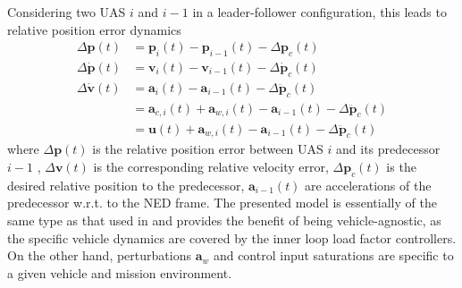 \documentclass{ifacconf}
\providecommand{\mbf}[1]{\mathbf{#1}}
\newcommand{\idxFollower}{{\ensuremath{i} }}
\newcommand{\idxPredecessor}{{\ensuremath{i-1} }}
\begin{document}
Considering two UAS \idxFollower  and \idxPredecessor in a leader-follower configuration, this leads to relative position error dynamics
\begin{align}
\Delta \mbf{p}(t) &= \mbf{p}_\idxFollower(t) - \mbf{p}_\idxPredecessor(t) - \Delta \mbf{p}_c(t) \\
\Delta \dot{\mbf{p}}(t) &= \mbf{v}_{\idxFollower}(t) - \mbf{v}_{\idxPredecessor}(t) -  \Delta \dot{\mbf{p}}_c(t) \\
\Delta \dot{\mbf{v}}(t) &= \mbf{a}_\idxFollower(t) - \mbf{a}_\idxPredecessor(t) -  \Delta \ddot{\mbf{p}}_c(t)\\
{} &= \mbf{a}_{c,\idxFollower}(t) + \mbf{a}_{w,\idxFollower}(t)
 - \mbf{a}_\idxPredecessor(t) -  \Delta \ddot{\mbf{p}}_c(t)\\
{} &= \mbf{u}(t) + \mbf{a}_{w,\idxFollower}(t)
 - \mbf{a}_\idxPredecessor(t) -  \Delta \ddot{\mbf{p}}_c(t)
\end{align}
where $\Delta \mbf{p}(t)$ is the relative position error between UAS \idxFollower and its predecessor \idxPredecessor, $\Delta \mbf{v}(t)$ is the corresponding relative velocity error, $\Delta \mbf{p}_c(t)$ is the desired relative position to the predecessor, $\mbf{a}_\idxPredecessor(t)$ are accelerations of the predecessor w.r.t. to the NED frame.
The presented model is essentially of the same type as that used in  \cite{galzi2006uav} and provides the benefit of being vehicle-agnostic, as the specific vehicle dynamics are covered by the inner loop load factor controllers. On the other hand, perturbations $\mbf{a}_w$ and control input saturations are specific to a given vehicle and mission environment. %
\end{document}
